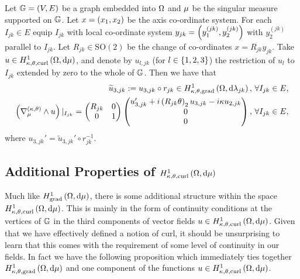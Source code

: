 \begin{cory} \label{cory:ktTanCurlsGraphs}
	Let $\mathbb{G}=\left( V,E \right)$ be a graph embedded into $\Omega$ and $\mu$ be the singular measure supported on $\mathbb{G}$.
	Let $x=\left( x_1,x_2 \right)$ be the axis co-ordinate system.
	For each $I_{jk}\in E$ equip $I_{jk}$ with local co-ordinate system $y_{jk}=\left( y_1^{(jk)}, y_2^{(jk)} \right)$ with $y_2^{(jk)}$ parallel to $I_{jk}$.
	Let $R_{jk}\in\mathrm{SO}(2)$ be the change of co-ordinates $x=R_{jk}y_{jk}$.
	Take $u\in H^1_{\kappa,\theta,\mathrm{curl}}\left( \Omega, \mathrm{d}\mu \right)$, and denote by $u_{l,jk}$ (for $l\in\left\{ 1,2,3 \right\}$) the restriction of $u_l$ to $I_{jk}$ extended by zero to the whole of $\mathbb{G}$.
	Then we have that 
	\begin{align*}
		\widetilde{u}_{3,jk} := u_{3,jk}\circ r_{jk}\in H^1_{\kappa,\theta,\mathrm{grad}}\left( \Omega, \mathrm{d}\lambda_{jk} \right), &\ \forall I_{jk}\in E, \\
		\left( \nabla_{\mu}^{\left( \kappa, \theta \right)}\wedge u \right)\vert_{I_{jk}} = \begin{pmatrix} R_{jk} & 0 \\ 0 & 1 \end{pmatrix} \begin{pmatrix} u_{3,jk}' + i\left( R_{jk}\theta \right)_2 u_{3,jk} - i\kappa u_{2,jk} \\ 0 \\ 0 \end{pmatrix}, 
		&\ \forall I_{jk}\in E,
	\end{align*}
	where $u_{3,jk}' = \widetilde{u}_{3,jk}' \circ r_{jk}^{-1}$.
\end{cory}

\subsection{Additional Properties of $H^1_{\kappa,\theta,\mathrm{curl}}\left( \Omega, \mathrm{d}\mu \right)$} \label{sec:ktcurlSobExtraProperties}
Much like $H^1_\mathrm{grad}\left( \Omega, \mathrm{d}\mu \right)$, there is some additional structure within the space $H^1_{\kappa,\theta,\mathrm{curl}}\left( \Omega, \mathrm{d}\mu \right)$.
This is mainly in the form of continuity conditions at the vertices of $\mathbb{G}$ in the third components of vector fields $u\in H^1_{\kappa,\theta,\mathrm{curl}}\left( \Omega, \mathrm{d}\mu \right)$.
Given that we have effectively defined a notion of curl, it should be unsurprising to learn that this comes with the requirement of some level of continuity in our fields.
In fact we have the following proposition which immediately ties together $H^1_{\kappa,\theta,\mathrm{grad}}\left( \Omega, \mathrm{d}\mu \right)$ and one component of the functions $u\in H^1_{\kappa,\theta,\mathrm{curl}}\left( \Omega, \mathrm{d}\mu \right)$.

